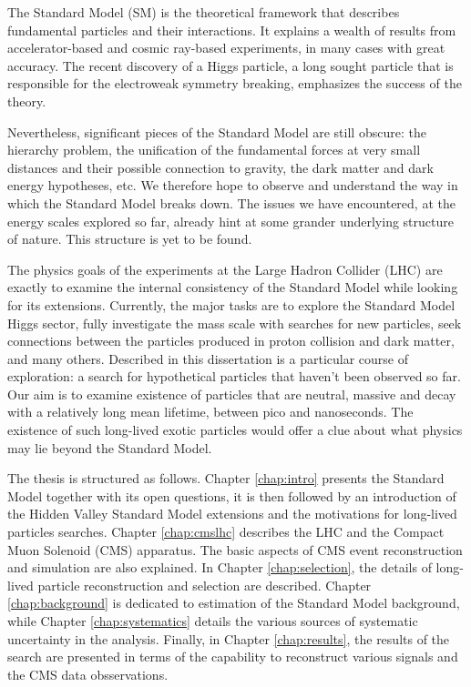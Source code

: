The Standard Model (SM) is the theoretical framework that describes fundamental particles
and their interactions. It explains a wealth of results from accelerator-based
and cosmic ray-based experiments, in many cases with great accuracy.
The recent discovery of a Higgs particle, a long sought particle that is responsible for
the electroweak symmetry 
breaking, emphasizes the success of the theory.

Nevertheless, significant pieces of the Standard Model are still obscure: the hierarchy
problem, the unification of the fundamental forces at very small distances and their possible
connection to gravity, the dark matter and dark energy hypotheses, etc. We therefore hope
to observe and understand the way in which the Standard Model breaks down.
The issues we have encountered, at the energy scales explored so far, already
hint at some grander underlying structure of nature. This structure is yet to be found.

The physics goals of the experiments at the Large Hadron Collider (LHC) are exactly to 
examine the internal consistency of the Standard Model while looking for its extensions.
Currently, the major tasks are to explore
the Standard Model Higgs sector, fully investigate the \TeV mass scale with searches
for new particles, seek connections between the particles 
produced in proton collision and dark matter, and many others. 
Described in this dissertation is a particular course of exploration: a search for hypothetical
particles that haven't been observed so far. Our aim is to examine existence of particles
that are neutral, 
massive and decay with a relatively long mean lifetime, between pico and nanoseconds. The existence
of such long-lived exotic
particles would offer a clue about what physics may lie beyond the Standard Model.

The thesis is structured as follows. Chapter \ref{chap:intro}
 presents the Standard Model together with its
open questions, it is then followed by an introduction of the Hidden Valley Standard 
Model extensions and
 the motivations for long-lived particles searches.
Chapter \ref{chap:cmslhc} describes the LHC and the Compact Muon Solenoid (CMS) apparatus.
The basic aspects of CMS event reconstruction and simulation are also explained.
In Chapter \ref{chap:selection},
the details of long-lived particle reconstruction and selection are described. 
Chapter \ref{chap:background} is dedicated to estimation of the Standard Model
 background, while Chapter
\ref{chap:systematics} details the various sources of systematic uncertainty in the analysis.
Finally, in Chapter \ref{chap:results}, the results of the search are presented in terms
of the capability to reconstruct various signals and the CMS data obsservations.

